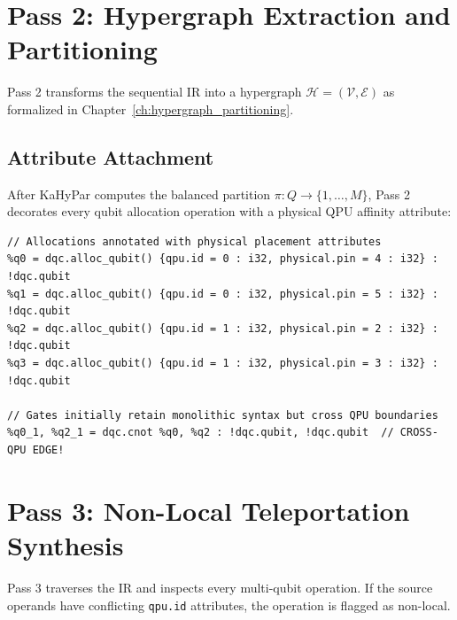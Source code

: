 \section{Pass 2: Hypergraph Extraction and Partitioning}
\label{sec:pass2_partitioning}

Pass 2 transforms the sequential IR into a hypergraph $\mathcal{H} = (\mathcal{V}, \mathcal{E})$ as formalized in Chapter~\ref{ch:hypergraph_partitioning}. 

\subsection{Attribute Attachment}
After KaHyPar computes the balanced partition $\pi: Q \to \{1, \dots, M\}$, Pass 2 decorates every qubit allocation operation with a physical QPU affinity attribute:

\begin{lstlisting}[language=MLIR, caption={Intermediate IR after Pass 2 (QPU Affinity Attached)}]
// Allocations annotated with physical placement attributes
%q0 = dqc.alloc_qubit() {qpu.id = 0 : i32, physical.pin = 4 : i32} : !dqc.qubit
%q1 = dqc.alloc_qubit() {qpu.id = 0 : i32, physical.pin = 5 : i32} : !dqc.qubit
%q2 = dqc.alloc_qubit() {qpu.id = 1 : i32, physical.pin = 2 : i32} : !dqc.qubit
%q3 = dqc.alloc_qubit() {qpu.id = 1 : i32, physical.pin = 3 : i32} : !dqc.qubit

// Gates initially retain monolithic syntax but cross QPU boundaries
%q0_1, %q2_1 = dqc.cnot %q0, %q2 : !dqc.qubit, !dqc.qubit  // CROSS-QPU EDGE!
\end{lstlisting}

\section{Pass 3: Non-Local Teleportation Synthesis}
\label{sec:pass3_synthesis}

Pass 3 traverses the IR and inspects every multi-qubit operation. If the source operands have conflicting \texttt{qpu.id} attributes, the operation is flagged as non-local.

